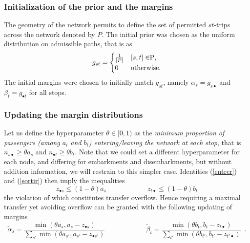 \documentclass{bmcart}
\begin{document}
\subsubsection{Initialization of the prior and the margins}
The geometry of the network permits to define the set of permitted $st$-trips across the network denoted by $P$. The initial prior was chosen as the uniform distribution on admissible paths, that is as
\begin{equation*}
g_{st} = \begin{cases}
  \frac{1}{\vert P \vert}    & [s, t] \in $P$, \\
  0    & \text{otherwise}.
\end{cases}
\end{equation*}
The initial margins were chosen to initially match $g_{st}$, namely $\alpha_s=g_{s \bullet}$ and $\beta_t=g_{\bullet t}$ for all stops. 



\subsubsection{Updating  the margin distributions}
\label{marginup}
Let us define the hyperparameter $ \theta\in [0, 1)$ as the \emph{minimum proportion of passengers (among $a_i$ and $b_i$) entering/leaving the network at each stop}, that is $n_{s\bullet}\ge \theta a_s$ and $n_{\bullet t}\ge \theta b_t$. Note that we could set a different hyperparameter for each node, and differing for embarkments and disembarkments, but without addition information, we will restrain to this simpler case. Identities (\ref{entrer}) and  (\ref{sortir}) then imply the inequalities
\begin{displaymath}
z_{\bullet s} \le (1 - \theta) a_s\qquad\qquad \qquad z_{t \bullet} \le  (1 - \theta) b_t
\end{displaymath}
the violation of which constitutes transfer overflow. Hence requiring a maximal transfer yet avoiding overflow can be granted with the following updating of margins
\begin{equation}
\label{alpha_beta_update}
\widetilde{\alpha}_s = \frac{\min(\theta a_s, a_s - z_{\bullet s})}{\sum_{s'} \min(\theta a_{s'}, a_{s'} - z_{\bullet {s'}})}   \qquad \qquad \qquad
	\widetilde{\beta}_t = \frac{\min(\theta b_t, b_t - z_{t \bullet})}{\sum_{t'} \min(\theta b_{t'}, b_{t'} - z_{{t'} \bullet})}  \enspace. 
\end{equation}
 
\end{document}
